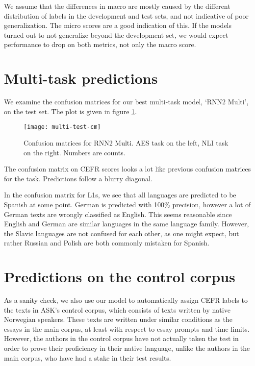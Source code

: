 We assume that the differences in macro \FI are mostly caused by the
different distribution of labels in the development and test sets, and not
indicative of poor generalization. The micro \FI scores are a good indication
of this. If the models turned out to not generalize beyond the development
set, we would expect performance to drop on both metrics, not only the macro
\FI score.


\section{Multi-task predictions}

We examine the confusion matrices for our best multi-task model, `RNN2 Multi',
on the test set. The plot is given in figure \ref{fig:multi-test-cm}.

\begin{figure}[]
  \centering
  \texttt{[image: multi-test-cm]}
  
  \caption[Multi-task confusion matrices]{
    Confusion matrices for RNN2 Multi. \ac{AES} task on the left, \ac{NLI}
    task on the right. Numbers are counts.
  }
  \label{fig:multi-test-cm}
\end{figure}

The confusion matrix on CEFR scores looks a lot like previous confusion matrices
for the task. Predictions follow a blurry diagonal.

In the confusion matrix for \acp{L1}, we see that all languages are predicted
to be Spanish at some point. German is predicted with 100\% precision,
however a lot of German texts are wrongly classified as English. This seems
reasonable since English and German are similar languages in the same
language family. However, the Slavic languages are not confused for each
other, as one might expect, but rather Russian and Polish are both commonly
mistaken for Spanish.


\section{Predictions on the control corpus}

As a sanity check, we also use our model to automatically assign CEFR labels
to the texts in ASK's control corpus, which consists of texts written by
native Norwegian speakers. These texts are written under similar conditions as
the essays in the main corpus, at least with respect to essay prompts and time
limits. However, the authors in the control corpus have not actually taken the
test in order to prove their proficiency in their native language, unlike the
authors in the main corpus, who have had a stake in their test results.

